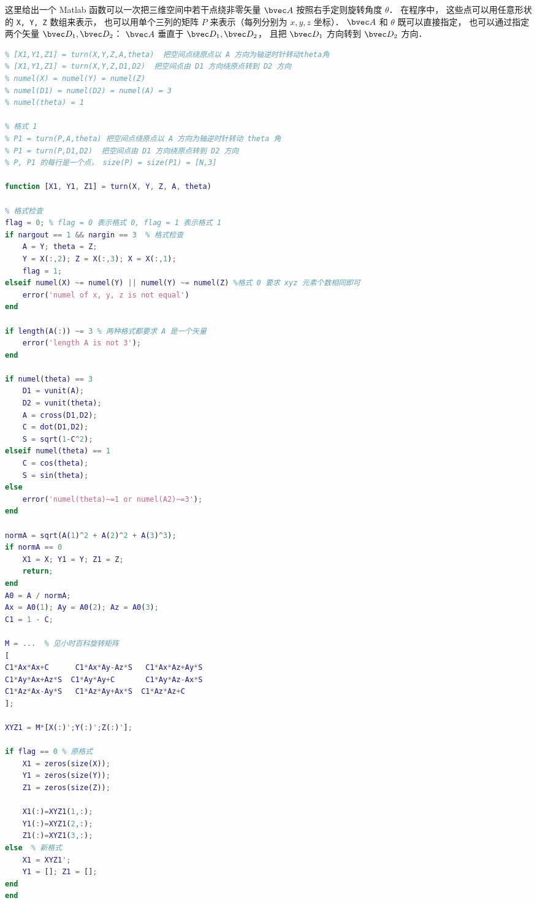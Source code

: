 

这里给出一个 Matlab 函数可以一次把三维空间中若干点绕非零矢量 $\bvec A$ 按照右手定则旋转角度 $\theta$． 在程序中， 这些点可以用任意形状的 \verb|X, Y, Z| 数组来表示， 也可以用单个三列的矩阵 $P$ 来表示（每列分别为 $x, y, z$ 坐标）． $\bvec A$ 和 $\theta$ 既可以直接指定， 也可以通过指定两个矢量 $\bvec D_1, \bvec D_2$： $\bvec A$ 垂直于 $\bvec D_1, \bvec D_2$， 且把 $\bvec D_1$ 方向转到 $\bvec D_2$ 方向．

\begin{lstlisting}[language=matlab, caption=turn.m]
% 格式 0
% [X1,Y1,Z1] = turn(X,Y,Z,A,theta)  把空间点绕原点以 A 方向为轴逆时针转动theta角
% [X1,Y1,Z1] = turn(X,Y,Z,D1,D2)  把空间点由 D1 方向绕原点转到 D2 方向
% numel(X) = numel(Y) = numel(Z)
% numel(D1) = numel(D2) = numel(A) = 3
% numel(theta) = 1

% 格式 1
% P1 = turn(P,A,theta) 把空间点绕原点以 A 方向为轴逆时针转动 theta 角
% P1 = turn(P,D1,D2)  把空间点由 D1 方向绕原点转到 D2 方向
% P, P1 的每行是一个点， size(P) = size(P1) = [N,3]

function [X1, Y1, Z1] = turn(X, Y, Z, A, theta)

% 格式检查
flag = 0; % flag = 0 表示格式 0, flag = 1 表示格式 1
if nargout == 1 && nargin == 3  % 格式检查
    A = Y; theta = Z;
    Y = X(:,2); Z = X(:,3); X = X(:,1);
    flag = 1;
elseif numel(X) ~= numel(Y) || numel(Y) ~= numel(Z) %格式 0 要求 xyz 元素个数相同即可
    error('numel of x, y, z is not equal')
end

if length(A(:)) ~= 3 % 两种格式都要求 A 是一个矢量
    error('length A is not 3');
end

if numel(theta) == 3
    D1 = vunit(A);
    D2 = vunit(theta);
    A = cross(D1,D2);
    C = dot(D1,D2);
    S = sqrt(1-C^2);
elseif numel(theta) == 1
    C = cos(theta);
    S = sin(theta);
else
    error('numel(theta)~=1 or numel(A2)~=3'); 
end

normA = sqrt(A(1)^2 + A(2)^2 + A(3)^3);
if normA == 0
    X1 = X; Y1 = Y; Z1 = Z;
    return;
end
A0 = A / normA;
Ax = A0(1); Ay = A0(2); Az = A0(3);
C1 = 1 - C;

M = ...  % 见小时百科旋转矩阵
[
C1*Ax*Ax+C      C1*Ax*Ay-Az*S   C1*Ax*Az+Ay*S
C1*Ay*Ax+Az*S  C1*Ay*Ay+C       C1*Ay*Az-Ax*S
C1*Az*Ax-Ay*S   C1*Az*Ay+Ax*S  C1*Az*Az+C 
];

XYZ1 = M*[X(:)';Y(:)';Z(:)'];

if flag == 0 % 原格式
    X1 = zeros(size(X));
    Y1 = zeros(size(Y));
    Z1 = zeros(size(Z));

    X1(:)=XYZ1(1,:);
    Y1(:)=XYZ1(2,:);
    Z1(:)=XYZ1(3,:);
else  % 新格式
    X1 = XYZ1';
    Y1 = []; Z1 = [];
end
end
\end{lstlisting}
